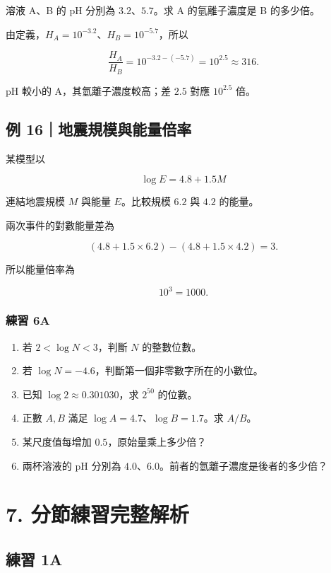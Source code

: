 \documentclass[11pt,a4paper]{article}
\providecommand{\tightlist}{%
  \setlength{\itemsep}{0pt}\setlength{\parskip}{0pt}}
\begin{document}
溶液 A、B 的 pH 分別為 \(3.2\)、\(5.7\)。求 A 的氫離子濃度是 B 的多少倍。

由定義，\(H_A=10^{-3.2}\)、\(H_B=10^{-5.7}\)，所以

\[
\frac{H_A}{H_B}=10^{-3.2-(-5.7)}=10^{2.5}\approx\boxed{316}.
\]

pH 較小的 A，其氫離子濃度較高；差 \(2.5\) 對應 \(10^{2.5}\) 倍。

\subsection{例 16｜地震規模與能量倍率}\label{ux4f8b-16ux5730ux9707ux898fux6a21ux8207ux80fdux91cfux500dux7387}

某模型以

\[
\log E=4.8+1.5M
\]

連結地震規模 \(M\) 與能量 \(E\)。比較規模 \(6.2\) 與 \(4.2\) 的能量。

兩次事件的對數能量差為

\[
(4.8+1.5\times6.2)-(4.8+1.5\times4.2)=3.
\]

所以能量倍率為

\[
10^3=\boxed{1000}.
\]

\subsubsection{練習 6A}\label{ux7df4ux7fd2-6a}

\begin{enumerate}
\def\labelenumi{\arabic{enumi}.}
\tightlist
\item
  若 \(2<\log N<3\)，判斷 \(N\) 的整數位數。
\item
  若 \(\log N=-4.6\)，判斷第一個非零數字所在的小數位。
\item
  已知 \(\log2\approx0.301030\)，求 \(2^{50}\) 的位數。
\item
  正數 \(A,B\) 滿足 \(\log A=4.7\)、\(\log B=1.7\)。求 \(A/B\)。
\item
  某尺度值每增加 \(0.5\)，原始量乘上多少倍？
\item
  兩杯溶液的 pH 分別為 \(4.0\)、\(6.0\)。前者的氫離子濃度是後者的多少倍？
\end{enumerate}

\section{7. 分節練習完整解析}\label{ux5206ux7bc0ux7df4ux7fd2ux5b8cux6574ux89e3ux6790}

\subsection{練習 1A}\label{ux7df4ux7fd2-1a-1}
\end{document}
